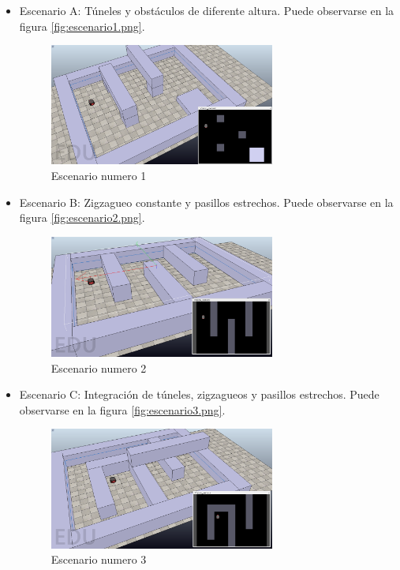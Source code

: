 \begin{itemize}
	\item Escenario A: Túneles y obstáculos de diferente altura. Puede observarse en la figura \ref{fig:escenario1.png}.	
	
	
\begin{figure}[h]
		\centering
        \includegraphics[width=0.7\textwidth]{images/escenario1.png}
        \caption{Escenario numero 1}
        \label{fig:escenario1}
\end{figure} 
	
	\item Escenario B: Zigzagueo constante y pasillos estrechos. Puede observarse en la figura \ref{fig:escenario2.png}.
	
		
\begin{figure}[h]
		\centering
        \includegraphics[width=0.7\textwidth]{images/escenario2.png}
        \caption{Escenario numero 2}
        \label{fig:escenario2}
\end{figure} 
	
	\item Escenario C: Integración de túneles, zigzagueos y pasillos estrechos. Puede observarse en la figura \ref{fig:escenario3.png}.

	
\begin{figure}[h]
		\centering
        \includegraphics[width=0.7\textwidth]{images/escenario3.png}
        \caption{Escenario numero 3}
        \label{fig:escenario3}
\end{figure} 

\end{itemize}




